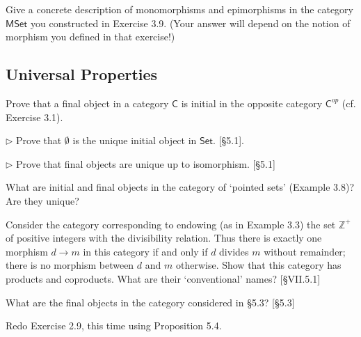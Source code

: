 \begin{problem}
  \def \MSet {\mathsf{MSet}}
  Give a concrete description of monomorphisms and epimorphisms in the
  category $\MSet$ you constructed in Exercise 3.9. (Your answer will depend
  on the notion of morphism you defined in that exercise!)
\end{problem}

\subsection{Universal Properties}

\begin{problem}
  \def \C {\mathsf{C}}
  \def \Cop {{\mathsf{C}^{op}}}
  Prove that a final object in a category $\C$ is initial in the opposite
  category $\Cop$ (cf. Exercise 3.1).
\end{problem}

\begin{problem}
  \def \Set {\mathsf{Set}}
  $\rhd$ Prove that $\emptyset$ is the unique initial object in $\Set$.
  [\S 5.1].
\end{problem}

\begin{problem}
  $\rhd$ Prove that final objects are unique up to isomorphism. [\S 5.1]
\end{problem}

\begin{problem}
  What are initial and final objects in the category of `pointed sets'
  (Example 3.8)? Are they unique?
\end{problem}

\begin{problem}
  Consider the category corresponding to endowing (as in Example 3.3) the set
  $\mathbb{Z}^+$ of positive integers with the divisibility relation. Thus
  there is exactly one morphism $d\to m$ in this category if and only if $d$
  divides $m$ without remainder; there is no morphism between $d$ and $m$
  otherwise. Show that this category has products and coproducts. What are
  their `conventional' names? [\S VII.5.1]
\end{problem}

\begin{problem}
  What are the final objects in the category considered in \S5.3? [\S5.3]
\end{problem}

\begin{problem}
  Redo Exercise 2.9, this time using Proposition 5.4.
\end{problem}

